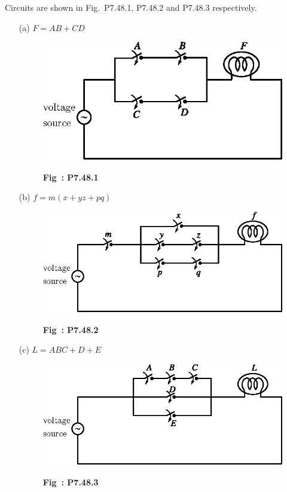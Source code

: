 \begin{solution}
Circuits are shown in Fig.~P7.48.1, P7.48.2 and P7.48.3 respectively.
\begin{itemize}
\item[(a)] $F = AB+CD$
\begin{figure}[H]
\centering
\includegraphics{chap5/figP5.48.1.eps}

\smallskip
{\bf Fig~: P7.48.1}
\end{figure}

\item[(b)] $f=m(x+yz+pq)$
\begin{figure}[H]
\centering
\includegraphics{chap5/figP5.48.2.eps}

\smallskip
{\bf Fig~: P7.48.2}
\end{figure}

\eject

\item[(c)] $L=ABC+D+E$
\begin{figure}[H]
\centering
\includegraphics[scale=.97]{chap5/figP5.48.3.eps}

\smallskip
{\bf Fig~: P7.48.3}
\end{figure}
\end{itemize}
\end{solution}

